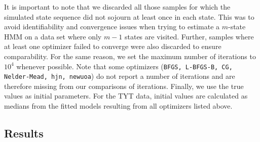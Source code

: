\documentclass[]{interact}\usepackage[]{graphicx}\usepackage[dvipsnames]{xcolor}
\theoremstyle{plain}%
\theoremstyle{definition}
\theoremstyle{remark}
\begin{document}

It is important to note that we discarded all those samples for which the simulated state sequence did not sojourn at least once in each state.
This was to avoid identifiability and convergence issues when trying to estimate a $m$-state HMM on a data set where only $m - 1$ states are visited.
Further, samples where at least one optimizer failed to converge were also discarded to ensure comparability.
For the same reason, we set the maximum number of iterations to \ensuremath{10^{4}} whenever possible.
Note that some optimizers (\texttt{BFGS, L-BFGS-B, CG, Nelder-Mead, hjn, newuoa}) do not report a number of iterations and are therefore missing from our comparisons of iterations.
Finally, we use the true values as initial parameters.
For the TYT data, initial values are calculated as medians from the fitted models resulting from all optimizers listed above.




\subsection{Results}
\label{results}
\end{document}
